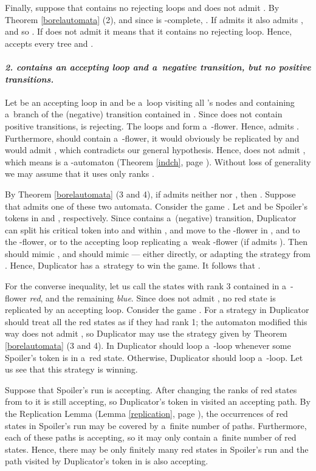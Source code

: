 \documentclass{LMCS}
\begin{document}
Finally, suppose that  contains no rejecting loops and  does not admit . By Theorem \ref{borelautomata} (2),  and since  is -complete, . If  admits  it also admits , and so . If  does not admit  it means that it contains no rejecting loop. Hence,  accepts every tree and .

\paragraph{{\em 2.  contains an accepting loop and a~negative transition, but no positive transitions. }} Let  be an accepting loop in  and  be a~loop visiting all 's nodes and containing a~branch of the (negative) transition contained in . Since  does not contain positive transitions,  is rejecting. The loops   and  form a~-flower. Hence,  admits .  Furthermore, should  contain a~-flower, it would obviously be replicated by  and  would admit , which contradicts our general hypothesis. Hence,  does not admit , which means  is a -automaton (Theorem \ref{indch}, page \pageref{indch}). Without loss of generality we may assume that it uses only ranks . 

By Theorem \ref{borelautomata} (3 and 4), if  admits neither  nor  , then . Suppose that  admits one of these two automata. Consider the game . Let  and  be Spoiler's tokens in  and , respectively. Since  contains a~(negative) transition, Duplicator can split his critical token into  and  within , and move  to the -flower in , and  to the -flower, or to the accepting loop replicating a~weak -flower (if  admits ). Then  should mimic , and  should mimic  --- either directly, or adapting the strategy from . Hence, Duplicator has a~strategy to win the game. It follows that . 

For the converse inequality, let us call the states with rank 3 contained in a~-flower {\em red}, and the remaining {\em blue}. Since  does not admit , no red state is replicated by an accepting loop. Consider the game . For a strategy in   Duplicator should treat all the red states as if they had rank 1; the automaton   modified this way does not admit , so Duplicator may use the strategy given by Theorem \ref{borelautomata} (3 and 4). In  Duplicator should loop a~-loop whenever some Spoiler's token is in a~red state. Otherwise, Duplicator should loop a~-loop. Let us see that this strategy is winning. 

Suppose that Spoiler's run is accepting. After changing the ranks of red states from  to  it is still accepting, so Duplicator's token in  visited an accepting path. By the Replication Lemma (Lemma \ref{replication}, page \pageref{replication}), the occurrences of red states in Spoiler's run may be covered by a~finite number of paths. Furthermore, each of these paths is accepting, so it may only contain a~finite number of red states. Hence, there may be only finitely many red states in Spoiler's run and the path visited by Duplicator's token in  is also accepting. 
\end{document}
